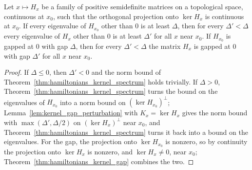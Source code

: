 \begin{theorem}
    \label{thm:hamiltonians_kernel_gap_continuity}
    \leanok
    Let $x\mapsto H_x$ be a family of positive semidefinite matrices on a
    topological space, continuous at $x_0$, such that the orthogonal projection
    onto $\ker H_x$ is continuous at $x_0$. If every eigenvalue of $H_{x_0}$ other
    than $0$ is at least $\Delta$, then for every $\Delta'<\Delta$ every eigenvalue
    of $H_x$ other than $0$ is at least $\Delta'$ for all $x$ near $x_0$. If $H_{x_0}$
    is gapped at $0$ with gap $\Delta$, then for every $\Delta'<\Delta$ the matrix
    $H_x$ is gapped at $0$ with gap $\Delta'$ for all $x$ near $x_0$.
\end{theorem}
\begin{proof}\leanok
    If $\Delta\le0$, then $\Delta'<0$ and the norm bound of
    Theorem~\ref{thm:hamiltonians_kernel_spectrum} holds trivially. If $\Delta>0$,
    Theorem~\ref{thm:hamiltonians_kernel_spectrum} turns the bound on the eigenvalues
    of $H_{x_0}$ into a norm bound on $(\ker H_{x_0})^\perp$;
    Lemma~\ref{lem:kernel_gap_perturbation} with $K_x=\ker H_x$ gives the norm bound
    with $\max(\Delta',\Delta/2)$ on $(\ker H_x)^\perp$ near $x_0$, and
    Theorem~\ref{thm:hamiltonians_kernel_spectrum} turns it back into a bound on the
    eigenvalues. For the gap, the projection onto $\ker H_{x_0}$ is nonzero, so by
    continuity the projection onto $\ker H_x$ is nonzero, and $\ker H_x\neq0$, near
    $x_0$; Theorem~\ref{thm:hamiltonians_kernel_gap} combines the two.
\end{proof}

